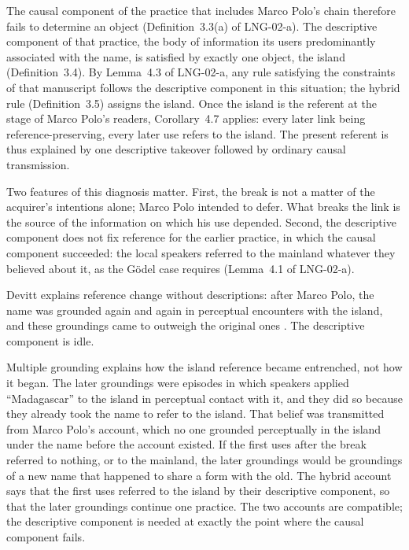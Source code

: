 \documentclass{situationist-preprint}
\begin{document}
The causal component of the practice that includes Marco Polo's chain therefore fails to determine an object (Definition~3.3(a) of LNG-02-a). The descriptive component of that practice, the body of information its users predominantly associated with the name, is satisfied by exactly one object, the island (Definition~3.4). By Lemma~4.3 of LNG-02-a, any rule satisfying the constraints of that manuscript follows the descriptive component in this situation; the hybrid rule (Definition~3.5) assigns the island. Once the island is the referent at the stage of Marco Polo's readers, Corollary~4.7 applies: every later link being reference-preserving, every later use refers to the island. The present referent is thus explained by one descriptive takeover followed by ordinary causal transmission.

Two features of this diagnosis matter. First, the break is not a matter of the acquirer's intentions alone; Marco Polo intended to defer. What breaks the link is the source of the information on which his use depended. Second, the descriptive component does not fix reference for the earlier practice, in which the causal component succeeded: the local speakers referred to the mainland whatever they believed about it, as the G\"odel case requires (Lemma~4.1 of LNG-02-a).

\begin{objection}
Devitt explains reference change without descriptions: after Marco Polo, the name was grounded again and again in perceptual encounters with the island, and these groundings came to outweigh the original ones \citep{Devitt1981}. The descriptive component is idle.
\end{objection}

\begin{reply}
Multiple grounding explains how the island reference became entrenched, not how it began. The later groundings were episodes in which speakers applied \enquote{Madagascar} to the island in perceptual contact with it, and they did so because they already took the name to refer to the island. That belief was transmitted from Marco Polo's account, which no one grounded perceptually in the island under the name before the account existed. If the first uses after the break referred to nothing, or to the mainland, the later groundings would be groundings of a new name that happened to share a form with the old. The hybrid account says that the first uses referred to the island by their descriptive component, so that the later groundings continue one practice. The two accounts are compatible; the descriptive component is needed at exactly the point where the causal component fails.
\end{reply}
\end{document}
